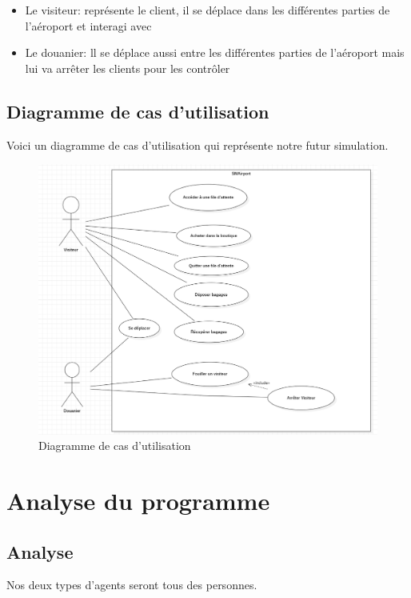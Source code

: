 \documentclass[12pt,french]{article} %
\begin{document}
\begin{itemize}
	\item Le visiteur: représente le client, il se déplace dans les différentes parties de l'aéroport et interagi avec
	
	\item Le douanier: ll se déplace aussi entre les différentes parties de l'aéroport mais lui va arrêter les clients pour les contrôler
\end{itemize}

\subsection{Diagramme de cas d'utilisation}

Voici un diagramme de cas d'utilisation qui représente notre futur simulation.

\begin{figure}[H]
	\centering
	\includegraphics[scale=0.285]{usecase.png}
	\caption{Diagramme de cas d'utilisation}    
\end{figure}

\section{Analyse du programme}

\subsection{Analyse}

Nos deux types d'agents seront tous des personnes.
\end{document}
